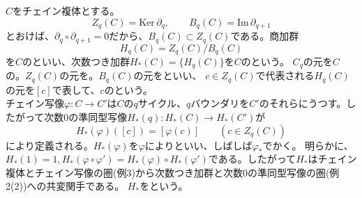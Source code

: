\documentclass[dvipdfmx,a4paper,11pt]{jsarticle}
\begin{document}
\begin{tcolorbox}[title = 例5]
  $C$をチェイン複体とする。
  \begin{equation*}
    Z_{q}(C)=\text{Ker}\, \partial_{q},\qquad B_{q}(C)=\text{Im}\, \partial_{q+1}
  \end{equation*}
  とおけば、$\partial_{q}\circ \partial_{q+1} = 0$だから、$B_{q}(C)\subset Z_{q}(C)$である。商加群
  \begin{equation*}
    H_{q}(C)=Z_{q}(C)/B_{q}(C)
  \end{equation*}
  を$C$のといい、次数つき加群$H_{*}(C)=\{H_{q}(C)\}$を$C$のという。
  $C_q$の元を$C$の。$Z_{q}(C)$の元を。$B_{q}(C)$の元をといい、
  $c\in Z_{q}(C)$で代表される$H_{q}(C)$の元を$[c]$で表して、$c$のという。\\
  チェイン写像$\varphi : C\to C'$は$C$の$q$サイクル、$q$バウンダリを$C'$のそれらにうつす。したがって次数$0$の準同型写像$H_{*}(q) : H_{*}(C)\to H_{*}(C')$が
  \begin{equation*}
    H_{*}(\varphi)([c])=[\varphi(c)]\qquad (c\in Z_{q}(C))
  \end{equation*}
  により定義される。$H_{*}(\varphi)$を$\varphi$によりといい、しばしば$\varphi_{*}$でかく。
  明らかに、$H_{*}(1)=1,H_{*}(\varphi \circ \varphi')=H_{*}(\varphi)\circ H_{*}(\varphi')$である。したがって$H_{*}$はチェイン複体とチェイン写像の圏(例3)から次数つき加群と次数$0$の準同型写像の圏(例2(2))への共変関手である。
  $H_{*}$をという。
\end{tcolorbox}
\end{document}

